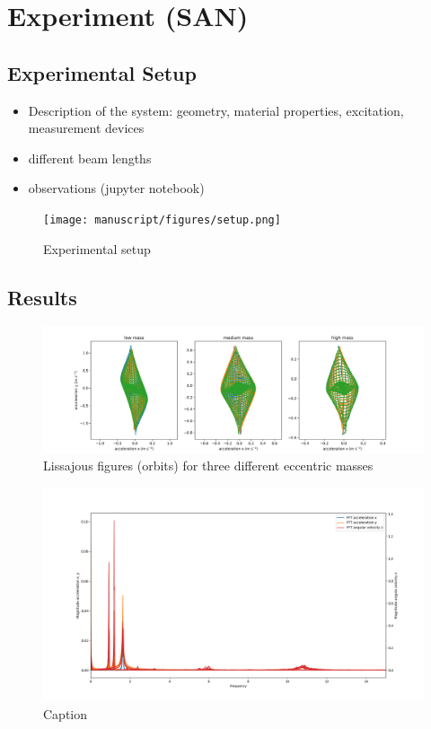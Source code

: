 \documentclass{article}
\begin{document}
\clearpage

\section{Experiment (SAN)}
\label{sec:experiment}

\subsection{Experimental Setup}

\begin{itemize}
    \item Description of the system: geometry, material properties, excitation, measurement devices
    \item different beam lengths
    \item observations (jupyter notebook)
\end{itemize}

\begin{figure}[ht!]
    \centering
    \texttt{[image: manuscript/figures/setup.png]}
    \caption{Experimental setup}
    \label{fig:setup}
\end{figure}

\subsection{Results}

\begin{figure}
    \centering
    \includegraphics[width=\linewidth]{results/experiment/lissajous.png}
    \caption{Lissajous figures (orbits) for three different eccentric masses}
    \label{fig:lissajous}
\end{figure}

\begin{figure}
    \centering
    \includegraphics[width=\linewidth]{results/experiment/spectrum.png}
    \caption{Caption}
    \label{fig:spectrum}
\end{figure}
\end{document}
